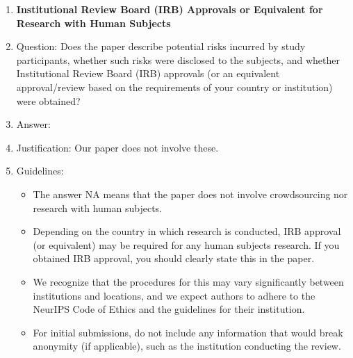 \documentclass{article}
\begin{document}
\begin{enumerate}
\item {\bf Institutional Review Board (IRB) Approvals or Equivalent for Research with Human Subjects}
    \item[] Question: Does the paper describe potential risks incurred by study participants, whether such risks were disclosed to the subjects, and whether Institutional Review Board (IRB) approvals (or an equivalent approval/review based on the requirements of your country or institution) were obtained?
    \item[] Answer: \answerNA{} %
    \item[] Justification: Our paper does not involve these.
    \item[] Guidelines:
    \begin{itemize}
        \item The answer NA means that the paper does not involve crowdsourcing nor research with human subjects.
        \item Depending on the country in which research is conducted, IRB approval (or equivalent) may be required for any human subjects research. If you obtained IRB approval, you should clearly state this in the paper. 
        \item We recognize that the procedures for this may vary significantly between institutions and locations, and we expect authors to adhere to the NeurIPS Code of Ethics and the guidelines for their institution. 
        \item For initial submissions, do not include any information that would break anonymity (if applicable), such as the institution conducting the review.
    \end{itemize}

\end{enumerate}
\end{document}
